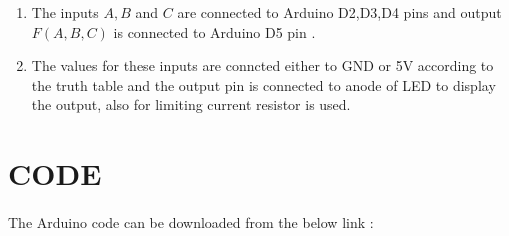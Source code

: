 \documentclass[a4paper,11pt,twocolumn]{article}
\begin{document}
\begin{enumerate}

	\item The inputs $A,B$ and $C$ are connected to Arduino D2,D3,D4 pins and output $F(A,B,C)$ is connected to Arduino D5 pin .
	\item The values for these inputs are conncted either to GND or 5V according to the truth table and the output pin is connected to anode of LED to display the output, also for limiting current resistor is used.
\end{enumerate}
\bigskip

\section{CODE}
\paragraph{}
The Arduino code can be downloaded from the below link :
\begin{center}
\end{center}
\end{document}
